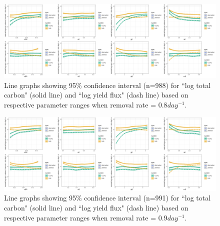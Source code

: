 \documentclass[../thesis.tex]{subfiles} %
\begin{document}
\begin{figure}[H]
    \centering
    \includegraphics[width=\linewidth]{../result/var_08.png}
    \caption[95\% distribution for $x=0.8day^{-1}$]{Line graphs showing 95\% confidence interval (n=988) for ``log total carbon" (solid line) and ``log yield flux" (dash line) based on respective parameter ranges when removal rate = 0.8$day^{-1}$.}
    \label{fig:v08}
\end{figure}

\begin{figure}[H]
    \centering
    \includegraphics[width=\linewidth]{../result/var_09.png}
    \caption[95\% distribution for $x=0.9day^{-1}$]{Line graphs showing 95\% confidence interval (n=991) for ``log total carbon" (solid line) and ``log yield flux" (dash line) based on respective parameter ranges when removal rate = 0.9$day^{-1}$.}
    \label{fig:v09}
\end{figure}
\end{document}
